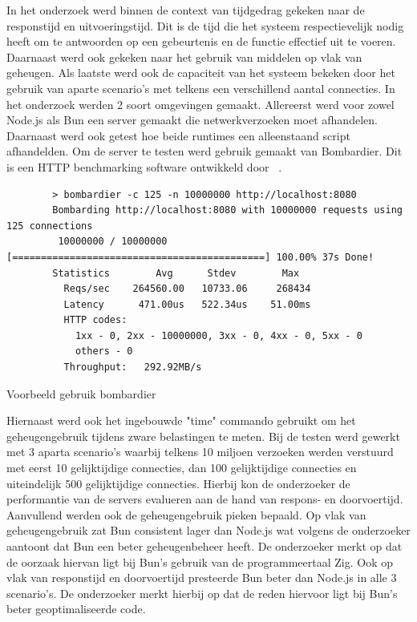 In het onderzoek werd binnen de context van tijdgedrag gekeken naar de responstijd en uitvoeringstijd. 
Dit is de tijd die het systeem respectievelijk nodig heeft om te antwoorden op een gebeurtenis en de functie effectief uit te voeren.
Daarnaast werd ook gekeken naar het gebruik van middelen op vlak van geheugen.
Als laatste werd ook de capaciteit van het systeem bekeken door het gebruik van aparte scenario's met telkens een verschillend aantal connecties.
In het onderzoek werden 2 soort omgevingen gemaakt. Allereerst werd voor zowel Node.js als Bun een server gemaakt die netwerkverzoeken moet afhandelen.
Daarnaast werd ook getest hoe beide runtimes een alleenstaand script afhandelden.
Om de server te testen werd gebruik gemaakt van Bombardier. Dit is een HTTP benchmarking software ontwikkeld door ~\textcite{Fedoseev2023}.
\begin{listing}[H]
    \centering
    \begin{verbatim}
        > bombardier -c 125 -n 10000000 http://localhost:8080
        Bombarding http://localhost:8080 with 10000000 requests using 125 connections
         10000000 / 10000000 [============================================] 100.00% 37s Done!
        Statistics        Avg      Stdev        Max
          Reqs/sec    264560.00   10733.06     268434
          Latency      471.00us   522.34us    51.00ms
          HTTP codes:
            1xx - 0, 2xx - 10000000, 3xx - 0, 4xx - 0, 5xx - 0
            others - 0
          Throughput:   292.92MB/s
        \end{verbatim}
        \caption{Voorbeeld gebruik bombardier \autocite{Fedoseev2023}}
\end{listing}
Hiernaast werd ook het ingebouwde "time" commando gebruikt om het geheugengebruik tijdens zware belastingen te meten.
Bij de testen werd gewerkt met 3 aparta scenario's waarbij telkens 10 miljoen verzoeken werden verstuurd met eerst 10 gelijktijdige connecties, 
dan 100 gelijktijdige connecties en uiteindelijk 500 gelijktijdige connecties.
Hierbij kon de onderzoeker de performantie van de servers evalueren aan de hand van respons- en doorvoertijd. Aanvullend werden ook de geheugengebruik pieken bepaald.
Op vlak van geheugengebruik zat Bun consistent lager dan Node.js wat volgens de onderzoeker aantoont dat Bun een beter geheugenbeheer heeft. 
De onderzoeker merkt op dat de oorzaak hiervan ligt bij Bun's gebruik van de programmeertaal Zig. 
Ook op vlak van responstijd en doorvoertijd presteerde Bun beter dan Node.js in alle 3 scenario's.
De onderzoeker merkt hierbij op dat de reden hiervoor ligt bij Bun's beter geoptimaliseerde code.


